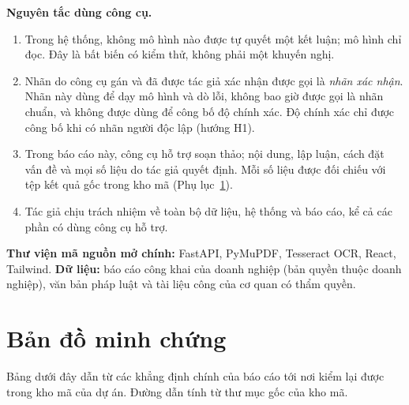 \textbf{Nguyên tắc dùng công cụ.}
\begin{enumerate}
\item Trong hệ thống, không mô hình nào được tự quyết một kết luận; mô hình chỉ đọc. Đây là bất biến có kiểm thử, không phải một khuyến nghị.
\item Nhãn do công cụ gán và đã được tác giả xác nhận được gọi là \emph{nhãn xác nhận}. Nhãn này dùng để dạy mô hình và dò lỗi, không bao giờ được gọi là nhãn chuẩn, và không được dùng để công bố độ chính xác. Độ chính xác chỉ được công bố khi có nhãn người độc lập (hướng H1).
\item Trong báo cáo này, công cụ hỗ trợ soạn thảo; nội dung, lập luận, cách đặt vấn đề và mọi số liệu do tác giả quyết định. Mỗi số liệu được đối chiếu với tệp kết quả gốc trong kho mã (Phụ lục~\ref{pl:minh-chung}).
\item Tác giả chịu trách nhiệm về toàn bộ dữ liệu, hệ thống và báo cáo, kể cả các phần có dùng công cụ hỗ trợ.
\end{enumerate}

\textbf{Thư viện mã nguồn mở chính:} FastAPI, PyMuPDF, Tesseract OCR, React, Tailwind. \textbf{Dữ liệu:} báo cáo công khai của doanh nghiệp (bản quyền thuộc doanh nghiệp), văn bản pháp luật và tài liệu công của cơ quan có thẩm quyền.

\chapter{Bản đồ minh chứng}\label{pl:minh-chung}

Bảng dưới đây dẫn từ các khẳng định chính của báo cáo tới nơi kiểm lại được trong kho mã của dự án. Đường dẫn tính từ thư mục gốc của kho mã.

